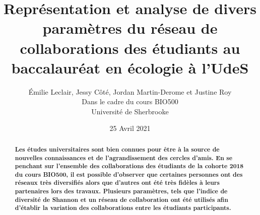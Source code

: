 \documentclass[12pt]{article}
\title{\bfseries Représentation et analyse de divers paramètres du réseau de collaborations des étudiants au baccalauréat en écologie à l'UdeS}
\author{\normalsize Émilie Leclair, Jessy Côté, Jordan Martin-Derome et Justine Roy \\
\small Dans le cadre du cours BIO500\\
 \small Université de Sherbrooke }
\date{\small 25 Avril 2021}
\begin{document}
\maketitle
\begin{abstract}
\textbf{Les études universitaires sont bien connues pour être à la source de nouvelles connaissances et de l’agrandissement des cercles d’amis. En se penchant sur l’ensemble des collaborations des étudiants de la cohorte 2018 du cours BIO500, il est possible d’observer que certaines personnes ont des réseaux très diversifiés alors que d’autres ont été très fidèles à leurs partenaires lors des travaux. Plusieurs paramètres, tels que l’indice de diversité de Shannon et un réseau de collaboration ont été utilisés afin d’établir la variation des collaborations entre les étudiants participants.} \\
\end{abstract}
\end{document}
